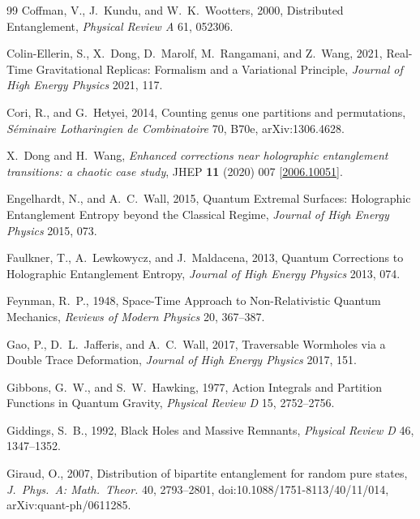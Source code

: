 \documentclass[11pt,letterpaper]{article}
\theoremstyle{plain}
\theoremstyle{definition}
\theoremstyle{remark}
\begin{document}
\begin{thebibliography}{99}
Coffman, V., J.~Kundu, and W.~K.~Wootters, 2000, Distributed Entanglement, \textit{Physical Review A} 61, 052306.

Colin-Ellerin, S., X.~Dong, D.~Marolf, M.~Rangamani, and Z.~Wang, 2021, Real-Time Gravitational Replicas: Formalism and a Variational Principle, \textit{Journal of High Energy Physics} 2021, 117.

Cori, R., and G.~Hetyei, 2014, Counting genus one partitions and permutations,
\textit{S\'eminaire Lotharingien de Combinatoire} 70, B70e, arXiv:1306.4628.

X.~Dong and H.~Wang, \emph{Enhanced corrections near holographic entanglement transitions: a chaotic case study},
JHEP \textbf{11} (2020) 007
[\href{https://arxiv.org/abs/2006.10051}{2006.10051}].

Engelhardt, N., and A.~C.~Wall, 2015, Quantum Extremal Surfaces: Holographic Entanglement Entropy beyond the Classical Regime, \textit{Journal of High Energy Physics} 2015, 073.

Faulkner, T., A.~Lewkowycz, and J.~Maldacena, 2013, Quantum Corrections to Holographic Entanglement Entropy, \textit{Journal of High Energy Physics} 2013, 074.

Feynman, R.~P., 1948, Space-Time Approach to Non-Relativistic Quantum Mechanics, \textit{Reviews of Modern Physics} 20, 367--387.

Gao, P., D.~L.~Jafferis, and A.~C.~Wall, 2017, Traversable Wormholes via a Double Trace Deformation, \textit{Journal of High Energy Physics} 2017, 151.

Gibbons, G.~W., and S.~W.~Hawking, 1977, Action Integrals and Partition Functions in Quantum Gravity, \textit{Physical Review D} 15, 2752--2756.

Giddings, S.~B., 1992, Black Holes and Massive Remnants, \textit{Physical Review D} 46, 1347--1352.

Giraud, O., 2007, Distribution of bipartite entanglement for random pure states,
\textit{J.\ Phys.\ A: Math.\ Theor.} 40, 2793--2801,
doi:10.1088/1751-8113/40/11/014, arXiv:quant-ph/0611285.


\end{thebibliography}
\end{document}
